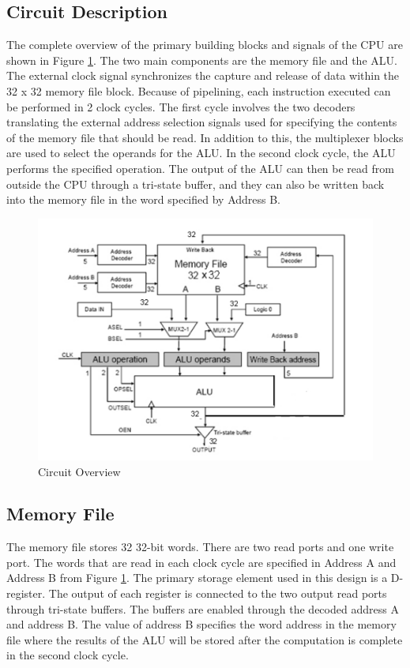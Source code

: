 \documentclass[12pt]{article}
\begin{document}
\subsection{Circuit Description}
The complete overview of the primary building blocks and signals of the CPU are shown in Figure \ref{fig:overview}. The two main components are the memory file and the ALU. The external clock signal synchronizes the capture and release of data within the 32 x 32 memory file block. Because of pipelining, each instruction executed can be performed in 2 clock cycles. The first cycle involves the two decoders translating the external address selection signals used for specifying the contents of the memory file that should be read. In addition to this, the multiplexer blocks are used to select the operands for the ALU. In the second clock cycle, the ALU performs the specified operation. The output of the ALU can then be read from outside the CPU through a tri-state buffer, and they can also be written back into the memory file in the word specified by Address B.
\begin{figure}[H]
\centering
\includegraphics[width=0.7\linewidth]{overview}
\caption{Circuit Overview}
\label{fig:overview}
\end{figure}

\subsection{Memory File}
The memory file stores 32 32-bit words. There are two read ports and one write port. The words that are read in each clock cycle are specified in Address A and Address B from Figure \ref{fig:overview}. The primary storage element used in this design is a D-register. The output of each register is connected to the two output read ports through tri-state buffers. The buffers are enabled through the decoded address A and address B. The value of address B specifies the word address in the memory file where the results of the ALU will be stored after the computation is complete in the second clock cycle.
\end{document}
